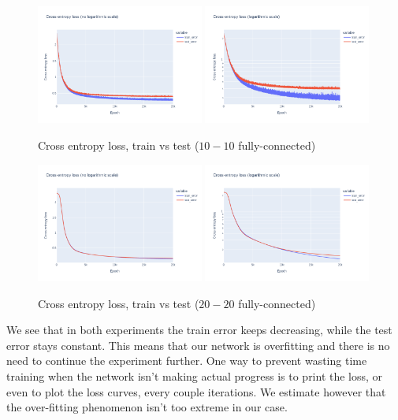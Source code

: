 \documentclass[12pt]{article}
\begin{document}
\begin{figure}[ht]
  \centering
  \includegraphics[width=0.49\textwidth]{images/cross-entropy-comparison-2-10-10.png}
  \includegraphics[width=0.49\textwidth]{images/cross-entropy-comparison-2-10-10-log.png}
  \caption{Cross entropy loss, train vs test ($10-10$ fully-connected)}
  \label{fig: loss comparison 2-10-10}
\end{figure}
\begin{figure}[ht]
  \centering
  \includegraphics[width=0.49\textwidth]{images/cross-entropy-comparison-2-20-20.png}
  \includegraphics[width=0.49\textwidth]{images/cross-entropy-comparison-2-20-20-log.png}
  \caption{Cross entropy loss, train vs test ($20-20$ fully-connected)}
  \label{fig: loss comparison 2-20-20}
\end{figure}
We see that in both experiments the train error keeps decreasing, while the test error stays constant.
This means that our network is overfitting and there is no need to continue the experiment further.
One way to prevent wasting time training when the network isn't making actual progress is to print the loss, or even to plot the loss curves, every couple iterations.
We estimate however that the over-fitting phenomenon isn't too extreme in our case.
\end{document}
